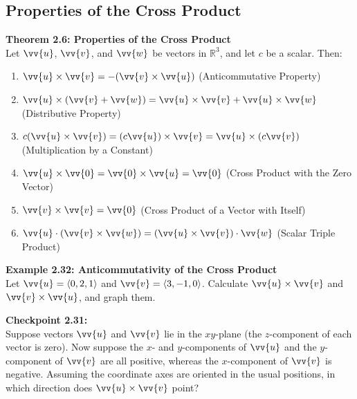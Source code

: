 \documentclass{article}
\begin{document}
\subsection*{Properties of the Cross Product}

\begin{theorembox}
    \textbf{Theorem 2.6: Properties of the Cross Product} \\
    Let \(\vv{u}\), \(\vv{v}\), and \(\vv{w}\) be vectors in \(\mathbb{R}^3\), and let \(c\) be a scalar. Then:
    \begin{enumerate}
        \item \(\vv{u} \times \vv{v} = -(\vv{v} \times \vv{u})\) \quad (Anticommutative Property)
        \item \(\vv{u} \times (\vv{v} + \vv{w}) = \vv{u} \times \vv{v} + \vv{u} \times \vv{w}\) \quad (Distributive Property)
        \item \(c(\vv{u} \times \vv{v}) = (c\vv{u}) \times \vv{v} = \vv{u} \times (c\vv{v})\) \quad (Multiplication by a Constant)
        \item \(\vv{u} \times \vv{0} = \vv{0} \times \vv{u} = \vv{0}\) \quad (Cross Product with the Zero Vector)
        \item \(\vv{v} \times \vv{v} = \vv{0}\) \quad (Cross Product of a Vector with Itself)
        \item \(\vv{u} \cdot (\vv{v} \times \vv{w}) = (\vv{u} \times \vv{v}) \cdot \vv{w}\) \quad (Scalar Triple Product)
    \end{enumerate}
\end{theorembox}

\begin{examplebox}
    \textbf{Example 2.32: Anticommutativity of the Cross Product} \\
    Let \(\vv{u} = \langle 0, 2, 1 \rangle\) and \(\vv{v} = \langle 3, -1, 0 \rangle\). Calculate \(\vv{u} \times \vv{v}\) and \(\vv{v} \times \vv{u}\), and graph them.
\end{examplebox}

\begin{exercisebox}
    \textbf{Checkpoint 2.31:} \\
    Suppose vectors \(\vv{u}\) and \(\vv{v}\) lie in the \(xy\)-plane (the \(z\)-component of each vector is zero). Now suppose the \(x\)- and \(y\)-components of \(\vv{u}\) and the \(y\)-component of \(\vv{v}\) are all positive, whereas the \(x\)-component of \(\vv{v}\) is negative. Assuming the coordinate axes are oriented in the usual positions, in which direction does \(\vv{u} \times \vv{v}\) point?
\end{exercisebox}
\end{document}
